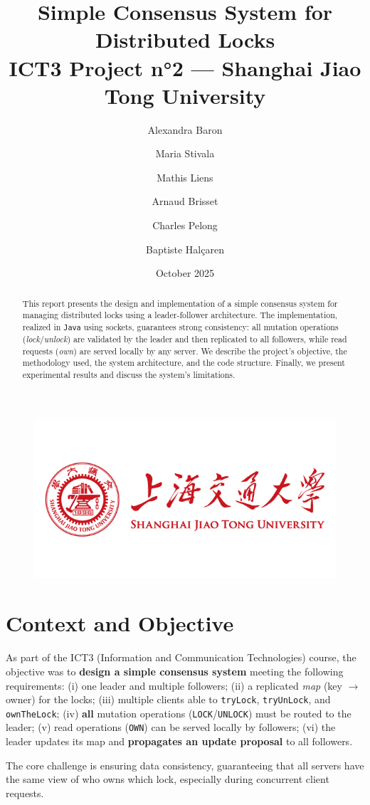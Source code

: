 \documentclass[a4paper,11pt]{article}
\title{Simple Consensus System for Distributed Locks\\
\large ICT3 Project n°2 — Shanghai Jiao Tong University}
\author{Alexandra Baron \and Maria Stivala \and Mathis Liens \and Arnaud Brisset \and Charles Pelong\and Baptiste Halçaren}
\date{October 2025}
\begin{document}
\maketitle

\begin{figure}[htbp]
\centering
\includegraphics[width=0.4\linewidth]{shanghai-jiao-tong-university.png}
\end{figure}

\begin{abstract}
This report presents the design and implementation of a simple consensus system for managing distributed locks using a leader-follower architecture. The implementation, realized in \texttt{Java} using sockets, guarantees strong consistency: all mutation operations (\emph{lock}/\emph{unlock}) are validated by the leader and then replicated to all followers, while read requests (\emph{own}) are served locally by any server. We describe the project's objective, the methodology used, the system architecture, and the code structure. Finally, we present experimental results and discuss the system's limitations.
\end{abstract}

\section{Context and Objective}
As part of the ICT3 (Information and Communication Technologies) course, the objective was to \textbf{design a simple consensus system} meeting the following requirements: (i) one leader and multiple followers; (ii) a replicated \textit{map} (key $\rightarrow$ owner) for the locks; (iii) multiple clients able to \texttt{tryLock}, \texttt{tryUnLock}, and \texttt{ownTheLock}; (iv) \textbf{all} mutation operations (\texttt{LOCK}/\texttt{UNLOCK}) must be routed to the leader; (v) read operations (\texttt{OWN}) can be served locally by followers; (vi) the leader updates its map and \textbf{propagates an update proposal} to all followers.

The core challenge is ensuring data consistency, guaranteeing that all servers have the same view of who owns which lock, especially during concurrent client requests.
\end{document}
